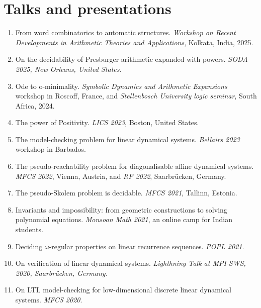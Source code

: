\documentclass{article}
\begin{document}
	\section*{Talks and presentations}
	\begin{enumerate}
            \item From word combinatorics to automatic structures. \emph{Workshop on Recent Developments in Arithmetic Theories and Applications}, Kolkata, India, 2025.
            \item On the decidability of Presburger arithmetic expanded with powers. \emph{SODA 2025, New Orleans, United States.}
		\item Ode to o-minimality. \emph{Symbolic Dynamics and Arithmetic Expansions} workshop in Roscoff, France, and \emph{Stellenbosch University logic seminar}, South Africa, 2024.
		\item The power of Positivity. \emph{LICS 2023}, Boston, United States.
		\item The model-checking problem for linear dynamical systems. \emph{Bellairs 2023} workshop in Barbados.
		\item The pseudo-reachability problem for diagonalisable affine dynamical systems. \emph{MFCS 2022}, Vienna, Austria, and \emph{RP 2022}, Saarbr\"ucken, Germany.
		\item The pseudo-Skolem problem is decidable. \emph{MFCS 2021}, Tallinn, Estonia.
		\item Invariants and impossibility: from geometric constructions to solving polynomial equations. \emph{Monsoon Math 2021}, an online camp for Indian students.
		\item Deciding $\omega$-regular properties on linear recurrence sequences. \emph{POPL 2021}.
		\item On verification of linear dynamical systems. \emph{Lighthning Talk at MPI-SWS, 2020, Saarbr\"ucken, Germany.}
		\item  On LTL model-checking for low-dimensional discrete
		linear dynamical systems. \emph{MFCS 2020}.
	\end{enumerate}
\end{document}
